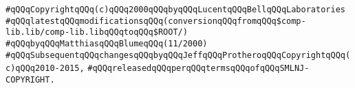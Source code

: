 \newline
\verb|#qQQqCopyrightqQQq(c)qQQq2000qQQqbyqQQqLucentqQQqBellqQQqLaboratories|\newline
\verb|#qQQqlatestqQQqmodificationsqQQq(conversionqQQqfromqQQq$comp-lib.lib/comp-lib.libqQQqtoqQQq$ROOT/|\verb|)|\newline
\verb|#qQQqbyqQQqMatthiasqQQqBlumeqQQq(11/2000)|\newline
\verb|#qQQqSubsequentqQQqchangesqQQqbyqQQqJeffqQQqProtheroqQQqCopyrightqQQq(c)qQQq2010-2015,|\newline
\verb|#qQQqreleasedqQQqperqQQqtermsqQQqofqQQqSMLNJ-COPYRIGHT.|\newline

